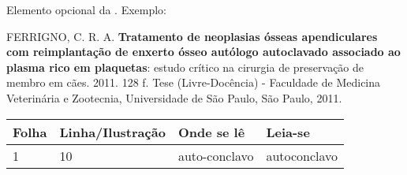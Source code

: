\documentclass[
    12pt,				%
    openright,			%
    twoside,			%
    a4paper,			%
    english,			%
    french,				%
    spanish,			%
    brazil				%
    ]{abntex2}
\begin{document}
\begin{errata}
    Elemento opcional da . Exemplo:
    
    \vspace{\onelineskip}
    
    FERRIGNO, C. R. A. \textbf{Tratamento de neoplasias ósseas apendiculares com
    reimplantação de enxerto ósseo autólogo autoclavado associado ao plasma
    rico em plaquetas}: estudo crítico na cirurgia de preservação de membro em
    cães. 2011. 128 f. Tese (Livre-Docência) - Faculdade de Medicina Veterinária e
    Zootecnia, Universidade de São Paulo, São Paulo, 2011.
    
    \begin{table}[htb]
    \center
    \footnotesize
    \begin{tabular}{|p{1.4cm}|p{3cm}|p{3cm}|p{3cm}|}
      \hline
       \textbf{Folha} & \textbf{Linha/Ilustração}  & \textbf{Onde se lê}  & \textbf{Leia-se}  \\
        \hline
        1 & 10 & auto-conclavo & autoconclavo\\
       \hline
    \end{tabular}
    \end{table}
    
    \end{errata}

\end{document}
